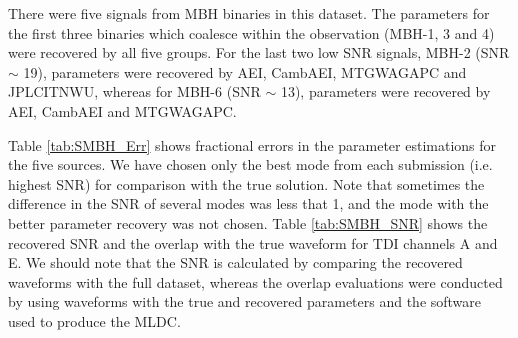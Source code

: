 \documentclass{iopart}
\begin{document}
There were five signals from MBH binaries in this dataset. The parameters for the first three binaries which coalesce within the observation (MBH-1, 3 and 4) were recovered by all five groups. For the last two low SNR signals, MBH-2 (SNR $\sim$ 19), parameters were recovered by AEI, CambAEI, MTGWAGAPC and JPLCITNWU, whereas for MBH-6 (SNR $\sim$ 13), parameters were recovered by AEI, CambAEI and MTGWAGAPC.  

Table \ref{tab:SMBH_Err} shows fractional errors in the parameter estimations for the five sources. We have chosen only the best mode from each submission (i.e. highest SNR) for comparison with the true solution. Note that 
sometimes the difference in the SNR of several modes was less that 1, and the mode with the better 
parameter recovery was not chosen.
Table \ref{tab:SMBH_SNR} shows the recovered SNR and the overlap with  the true waveform for TDI channels A and E. We should note that the SNR is calculated by comparing the recovered waveforms with the full dataset, whereas the overlap evaluations were conducted by using waveforms with the true and recovered parameters and the software
used to produce the MLDC.
\end{document}
